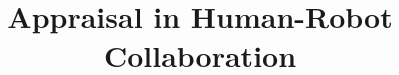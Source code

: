 \documentclass{aamas2016}
\begin{document}
\algnewcommand{}
\algnewcommand{}



\title{Appraisal in Human-Robot Collaboration}




%
%
%
%

%

\end{document}
